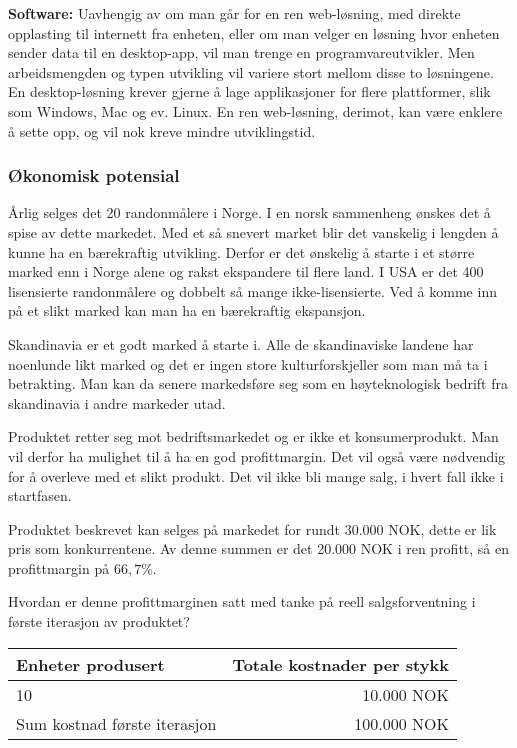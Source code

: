 \textbf{Software:}
Uavhengig av om man går for en ren web-løsning, med direkte opplasting til internett fra enheten, eller om man velger en løsning hvor enheten sender data til en desktop-app, vil man trenge en programvareutvikler.
Men arbeidsmengden og typen utvikling vil variere stort mellom disse to løsningene.
En desktop-løsning krever gjerne å lage applikasjoner for flere plattformer, slik som Windows, Mac og ev. Linux.
En ren web-løsning, derimot, kan være enklere å sette opp, og vil nok kreve mindre utviklingstid.

\subsubsection{Økonomisk potensial}

Årlig selges det 20 randonmålere i Norge. I en norsk sammenheng ønskes det å spise av dette markedet. Med et så snevert market blir det vanskelig i lengden å kunne ha en bærekraftig utvikling. Derfor er det ønskelig å starte i et større marked enn i Norge alene og rakst ekspandere til flere land. I USA er det 400 lisensierte randonmålere og dobbelt så mange ikke-lisensierte. Ved å komme inn på et slikt marked kan man ha en bærekraftig ekspansjon.

Skandinavia er et godt marked å starte i. Alle de skandinaviske landene har noenlunde likt marked og det er ingen store kulturforskjeller som man må ta i betrakting. Man kan da senere markedsføre seg som en høyteknologisk bedrift fra skandinavia i andre markeder utad.

Produktet retter seg mot bedriftsmarkedet og er ikke et konsumerprodukt. Man vil derfor ha mulighet til å ha en god profittmargin. Det vil også være nødvendig for å overleve med et slikt produkt. Det vil ikke bli mange salg, i hvert fall ikke i startfasen.

Produktet beskrevet kan selges på markedet for rundt 30.000 NOK, dette er lik pris som konkurrentene. Av denne summen er det 20.000 NOK i ren profitt, så en profittmargin på $66,7 \%$.

Hvordan er denne profittmarginen satt med tanke på reell salgsforventning i første iterasjon av produktet?

\begin{table}[ht!]
    \begin{center}
    \begin{tabular}{ | l | r | }
        \hline
        Enheter produsert               & Totale kostnader per stykk \\
        \hline
        10                              & 10.000 NOK \\
        \hline
        Sum kostnad første iterasjon    & 100.000 NOK \\
        \hline
    \end{tabular}
    \end{center}
\end{table}

